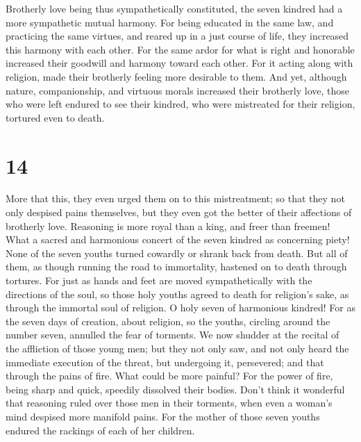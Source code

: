  Brotherly love being thus sympathetically constituted, the
seven kindred had a more sympathetic mutual harmony.  For
being educated in the same law, and practicing the same virtues, and
reared up in a just course of life, they increased this harmony with
each other.  For the same ardor for what is right and
honorable increased their goodwill and harmony toward each other.
 For it acting along with religion, made their brotherly
feeling more desirable to them.  And yet, although nature,
companionship, and virtuous morals increased their brotherly love, those
who were left endured to see their kindred, who were mistreated for
their religion, tortured even to death.

\hypertarget{section-13}{%
\section{14}\label{section-13}}

 More that this, they even urged them on to this
mistreatment; so that they not only despised pains themselves, but they
even got the better of their affections of brotherly love. 
Reasoning is more royal than a king, and freer than freemen!
 What a sacred and harmonious concert of the seven kindred
as concerning piety!  None of the seven youths turned
cowardly or shrank back from death.  But all of them, as
though running the road to immortality, hastened on to death through
tortures.  For just as hands and feet are moved
sympathetically with the directions of the soul, so those holy youths
agreed to death for religion's sake, as through the immortal soul of
religion.  O holy seven of harmonious kindred! For as the
seven days of creation, about religion,  so the youths,
circling around the number seven, annulled the fear of torments.
 We now shudder at the recital of the affliction of those
young men; but they not only saw, and not only heard the immediate
execution of the threat, but undergoing it, persevered; and that through
the pains of fire.  What could be more painful? For the
power of fire, being sharp and quick, speedily dissolved their bodies.
 Don't think it wonderful that reasoning ruled over those
men in their torments, when even a woman's mind despised more manifold
pains.  For the mother of those seven youths endured the
rackings of each of her children.

